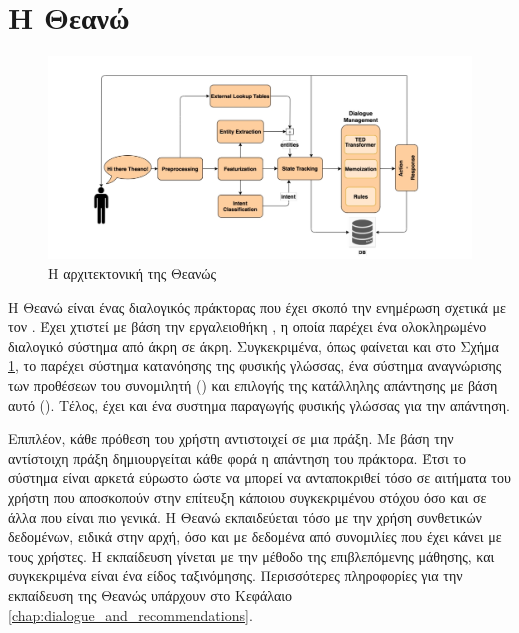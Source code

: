 \section{Η Θεανώ}

\begin{figure}
    \centering
    \includegraphics[width=\textwidth]{body_matter/introduction/images/theano-architecture.jpeg}
    \caption{Η αρχιτεκτονική της Θεανώς}
    \label{fig:theano_architecture}
\end{figure}

Η Θεανώ είναι ένας διαλογικός πράκτορας που έχει σκοπό την ενημέρωση σχετικά με τον \cite{ventoura-etal-2021-theano}.
Έχει χτιστεί με βάση την εργαλειοθήκη , η οποία παρέχει ένα ολοκληρωμένο διαλογικό σύστημα από άκρη σε άκρη.
Συγκεκριμένα, όπως φαίνεται και στο Σχήμα \ref{fig:theano_architecture}, το  παρέχει σύστημα κατανόησης της φυσικής γλώσσας,
ένα σύστημα αναγνώρισης των προθέσεων του συνομιλητή () και επιλογής της κατάλληλης απάντησης με βάση αυτό ().
Τέλος, έχει και ένα συστημα παραγωγής φυσικής γλώσσας για την απάντηση.

Επιπλέον, κάθε πρόθεση του χρήστη αντιστοιχεί σε μια πράξη. Με βάση την αντίστοιχη πράξη δημιουργείται κάθε φορά η απάντηση του πράκτορα.
Έτσι το σύστημα είναι αρκετά εύρωστο ώστε να μπορεί να ανταποκριθεί τόσο σε αιτήματα του χρήστη που αποσκοπούν στην επίτευξη κάποιου
συγκεκριμένου στόχου όσο και σε άλλα που είναι πιο γενικά. H Θεανώ εκπαιδεύεται τόσο με την χρήση συνθετικών δεδομένων, ειδικά στην αρχή,
όσο και με δεδομένα από συνομιλίες που έχει κάνει με τους χρήστες.
Η εκπαίδευση γίνεται με την μέθοδο της επιβλεπόμενης μάθησης, και συγκεκριμένα είναι ένα είδος ταξινόμησης. Περισσότερες πληροφορίες για την
εκπαίδευση της Θεανώς υπάρχουν στο Κεφάλαιο \ref{chap:dialogue_and_recommendations}.

